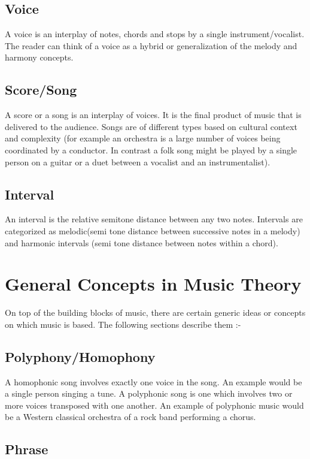 \subsection{Voice}
\noindent A voice is an interplay of notes, chords and stops by a single instrument/vocalist. The reader can think of a voice as a hybrid or generalization of the melody and harmony concepts. 

\subsection{Score/Song}
\noindent A score or a song is an interplay of voices. It is the final product of music that is delivered to the audience. Songs are of different types based on cultural context and complexity (for example an orchestra is a large number of voices being coordinated by a conductor. In contrast a folk song might be played by a single person on a guitar or a duet between a vocalist and an instrumentalist). 

\subsection{Interval}
\noindent An interval is the relative semitone distance between any two notes. Intervals are categorized as melodic(semi tone distance between successive notes in a melody) and harmonic intervals (semi tone distance between notes within a chord). 

\section{General Concepts in Music Theory}

\noindent On top of the building blocks of music, there are certain generic ideas or concepts on which music is based. The following sections describe them :-

\subsection{Polyphony/Homophony}

\noindent A homophonic song involves exactly one voice in the song. An example would be a single person singing a tune. A polyphonic song is one which involves two or more voices transposed with one another. An example of polyphonic music would be a Western classical orchestra of a rock band performing a chorus.

\subsection{Phrase}

